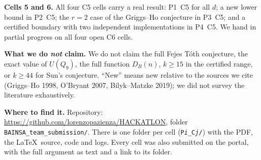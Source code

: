 \documentclass[10pt]{article}
\begin{document}
\medskip
\noindent\textbf{Cells 5 and 6.} All four C5 cells carry a real result: P1~C5 for all $d$; a new lower bound in P2~C5; the $r=2$ case of the Griggs--Ho conjecture in P3~C5; and a certified boundary with two independent implementations in P4~C5. We hand in partial progress on all four open C6 cells.

\medskip
\noindent\textbf{What we do \emph{not} claim.} We do not claim the full Fejes T\'oth conjecture, the exact value of $U(Q_9)$, the full function $D_B(n)$, $k\ge15$ in the certified range, or $k\ge44$ for Sun's conjecture. ``New'' means new relative to the sources we cite (Griggs--Ho 1998, O'Bryant 2007, Bilyk--Matzke 2019); we did not survey the literature exhaustively.

\medskip
\noindent\textbf{Where to find it.} Repository: \url{https://github.com/lorenzopazienza/HACKATLON}, folder \texttt{BAINSA\_team\_submission/}. There is one folder per cell (\texttt{P\emph{i}\_C\emph{j}/}) with the PDF, the \LaTeX\ source, code and logs. Every cell was also submitted on the portal, with the full argument as text and a link to its folder.
\end{document}

